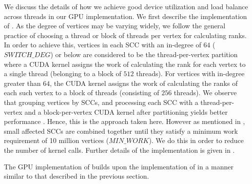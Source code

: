 We discuss the details of how we achieve good device utilization and load balance across threads in our GPU implementation. We first describe the implementation of \monolithicPR{}. As the degree of vertices may be varying widely, we follow the general practice of choosing a thread or block of threads per vertex for calculating ranks. In order to achieve this, vertices in each SCC with an in-degree of $64$ ($SWITCH\_DEG$) or below are considered to be the thread-per-vertex partition where a CUDA kernel assigns the work of calculating the rank for each vertex to a single thread (belonging to a block of $512$ threads). For vertices with in-degree greater than $64$, the CUDA kernel assigns the work of calculating the ranks of each such vertex to a block of threads (consisting of $256$ threads). We observe that grouping vertices by SCCs, and processing each SCC with a thread-per-vertex and a block-per-vertex CUDA kernel after partitioning yields better performance \cite{gh-levl21}. Hence, this is the approach taken here. However as mentioned in \cite{gh-levl21}, small affected SCCs are combined together until they satisfy a minimum work requirement of 10 million vertices ($MIN\_WORK$). We do this in order to reduce the number of kernel calls. Further details of the implementation is given in \cite{gh-levl21}.

The GPU implementation of \levelwisePR{} builds upon the implementation of \monolithicPR{}  in a manner similar to that described in the previous section. 






